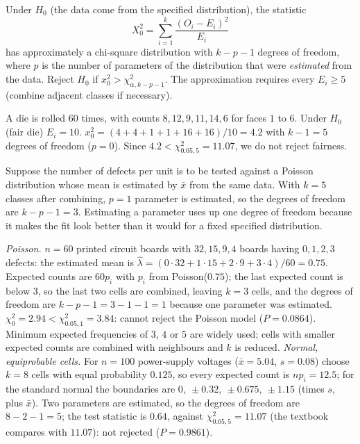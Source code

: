 \begin{theorem}\label{thm:gof}
Under $H_0$ (the data come from the specified distribution), the statistic
\[ X_0^2=\sum_{i=1}^k\frac{(O_i-E_i)^2}{E_i} \]
has approximately a chi-square distribution with $k-p-1$ degrees of freedom, where $p$ is the number of parameters of the distribution that were \emph{estimated} from the data. Reject $H_0$ if $x_0^2>\chi^2_{\alpha,k-p-1}$. The approximation requires every $E_i\ge5$ (combine adjacent classes if necessary).
\end{theorem}

\begin{example}
A die is rolled $60$ times, with counts $8,12,9,11,14,6$ for faces $1$ to $6$. Under $H_0$ (fair die) $E_i=10$. $x_0^2=(4+4+1+1+16+16)/10=4.2$ with $k-1=5$ degrees of freedom ($p=0$). Since $4.2<\chi^2_{0.05,5}=11.07$, we do not reject fairness.
\end{example}

\begin{example}
Suppose the number of defects per unit is to be tested against a Poisson distribution whose mean is estimated by $\bar{x}$ from the same data. With $k=5$ classes after combining, $p=1$ parameter is estimated, so the degrees of freedom are $k-p-1=3$. Estimating a parameter uses up one degree of freedom because it makes the fit look better than it would for a fixed specified distribution.
\end{example}

\begin{example}
\emph{Poisson.} $n=60$ printed circuit boards with $32, 15, 9, 4$ boards having $0,1,2,3$ defects: the estimated mean is $\hat\lambda=(0\cdot32+1\cdot15+2\cdot9+3\cdot4)/60=0.75$. Expected counts are $60p_i$ with $p_i$ from Poisson($0.75$); the last expected count is below $3$, so the last two cells are combined, leaving $k=3$ cells, and the degrees of freedom are $k-p-1=3-1-1=1$ because one parameter was estimated. $\chi_0^2=2.94<\chi^2_{0.05,1}=3.84$: cannot reject the Poisson model ($P=0.0864$). Minimum expected frequencies of $3$, $4$ or $5$ are widely used; cells with smaller expected counts are combined with neighbours and $k$ is reduced.
\emph{Normal, equiprobable cells.} For $n=100$ power-supply voltages ($\bar{x}=5.04$, $s=0.08$) choose $k=8$ cells with equal probability $0.125$, so every expected count is $np_i=12.5$; for the standard normal the boundaries are $0,\ \pm0.32,\ \pm0.675,\ \pm1.15$ (times $s$, plus $\bar{x}$). Two parameters are estimated, so the degrees of freedom are $8-2-1=5$; the test statistic is $0.64$, against $\chi^2_{0.05,5}=11.07$ (the textbook compares with $11.07$): not rejected ($P=0.9861$).
\end{example}

